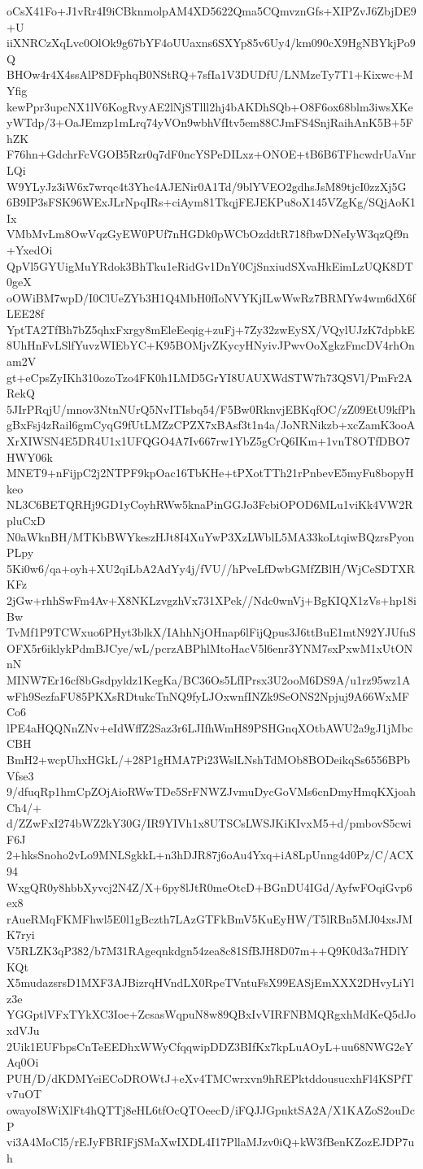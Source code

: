 oCsX41Fo+J1vRr4I9iCBknmolpAM4XD5622Qma5CQmvznGfs+XIPZvJ6ZbjDE9+U
iiXNRCzXqLvc0OlOk9g67bYF4oUUaxns6SXYp85v6Uy4/km090cX9HgNBYkjPo9Q
BHOw4r4X4ssAlP8DFphqB0NStRQ+7sfIa1V3DUDfU/LNMzeTy7T1+Kixwc+MYfig
kewPpr3upcNX1lV6KogRvyAE2lNjSTlll2hj4bAKDhSQb+O8F6ox68blm3iwsXKe
yWTdp/3+OaJEmzp1mLrq74yVOn9wbhVfItv5em88CJmFS4SnjRaihAnK5B+5FhZK
F76hn+GdchrFcVGOB5Rzr0q7dF0ncYSPeDILxz+ONOE+tB6B6TFhcwdrUaVnrLQi
W9YLyJz3iW6x7wrqc4t3Yhc4AJENir0A1Td/9blYVEO2gdhsJsM89tjcI0zzXj5G
6B9IP3sFSK96WExJLrNpqIRs+ciAym81TkqjFEJEKPu8oX145VZgKg/SQjAoK1Ix
VMbMvLm8OwVqzGyEW0PUf7nHGDk0pWCbOzddtR718fbwDNeIyW3qzQf9n+YxedOi
QpVl5GYUigMuYRdok3BhTku1eRidGv1DnY0CjSnxiudSXvaHkEimLzUQK8DT0geX
oOWiBM7wpD/I0ClUeZYb3H1Q4MbH0fIoNVYKjILwWwRz7BRMYw4wm6dX6fLEE28f
YptTA2TfBh7bZ5qhxFxrgy8mEleEeqig+zuFj+7Zy32zwEySX/VQylUJzK7dpbkE
8UhHnFvLSlfYuvzWIEbYC+K95BOMjvZKycyHNyivJPwvOoXgkzFmcDV4rhOnam2V
gt+eCpsZyIKh310ozoTzo4FK0h1LMD5GrYI8UAUXWdSTW7h73QSVl/PmFr2ARekQ
5JIrPRqjU/mnov3NtnNUrQ5NvITIsbq54/F5Bw0RknvjEBKqfOC/zZ09EtU9kfPh
gBxFsj4zRail6gmCyqG9fUtLMZzCPZX7xBAsf3t1n4a/JoNRNikzb+xcZamK3ooA
XrXIWSN4E5DR4U1x1UFQGO4A7Iv667rw1YbZ5gCrQ6IKm+1vnT8OTfDBO7HWY06k
MNET9+nFijpC2j2NTPF9kpOac16TbKHe+tPXotTTh21rPnbevE5myFu8bopyHkeo
NL3C6BETQRHj9GD1yCoyhRWw5knaPinGGJo3FcbiOPOD6MLu1viKk4VW2RpluCxD
N0aWknBH/MTKbBWYkeszHJt8I4XuYwP3XzLWblL5MA33koLtqiwBQzrsPyonPLpy
5Ki0w6/qa+oyh+XU2qiLbA2AdYy4j/fVU//hPveLfDwbGMfZBlH/WjCeSDTXRKFz
2jGw+rhhSwFm4Av+X8NKLzvgzhVx731XPek//Ndc0wnVj+BgKIQX1zVs+hp18iBw
TvMf1P9TCWxuo6PHyt3blkX/IAhhNjOHnap6lFijQpus3J6ttBuE1mtN92YJUfuS
OFX5r6iklykPdmBJCye/wL/pcrzABPhlMtoHacV5l6enr3YNM7sxPxwM1xUtONnN
MINW7Er16cf8bGsdpyldz1KegKa/BC36Os5LfIPrsx3U2ooM6DS9A/u1rz95wz1A
wFh9SezfaFU85PKXsRDtukcTnNQ9fyLJOxwnfINZk9SeONS2Npjuj9A66WxMFCo6
lPE4aHQQNnZNv+eIdWffZ2Saz3r6LJIfhWmH89PSHGnqXOtbAWU2a9gJ1jMbcCBH
BmH2+wcpUhxHGkL/+28P1gHMA7Pi23WslLNshTdMOb8BODeikqSs6556BPbVfse3
9/dfuqRp1hmCpZOjAioRWwTDe5SrFNWZJvmuDycGoVMs6cnDmyHmqKXjoahCh4/+
d/ZZwFxI274bWZ2kY30G/IR9YIVh1x8UTSCsLWSJKiKIvxM5+d/pmbovS5cwiF6J
2+hksSnoho2vLo9MNLSgkkL+n3hDJR87j6oAu4Yxq+iA8LpUnng4d0Pz/C/ACX94
WxgQR0y8hbbXyvcj2N4Z/X+6py8lJtR0meOtcD+BGnDU4IGd/AyfwFOqiGvp6ex8
rAueRMqFKMFhwl5E0l1gBczth7LAzGTFkBmV5KuEyHW/T5lRBn5MJ04xsJMK7ryi
V5RLZK3qP382/b7M31RAgeqnkdgn54zea8c81SfBJH8D07m++Q9K0d3a7HDlYKQt
X5mudazsrsD1MXF3AJBizrqHVndLX0RpeTVntuFsX99EASjEmXXX2DHvyLiYlz3e
YGGptlVFxTYkXC3Ioe+ZcsasWqpuN8w89QBxIvVIRFNBMQRgxhMdKeQ5dJoxdVJu
2Uik1EUFbpsCnTeEEDhxWWyCfqqwipDDZ3BIfKx7kpLuAOyL+uu68NWG2eYAq0Oi
PUH/D/dKDMYeiECoDROWtJ+eXv4TMCwrxvn9hREPktddousucxhFl4KSPfTv7uOT
owayoI8WiXlFt4hQTTj8eHL6tfOcQTOeecD/iFQJJGpnktSA2A/X1KAZoS2ouDcP
vi3A4MoCl5/rEJyFBRIFjSMaXwIXDL4I17PllaMJzv0iQ+kW3fBenKZozEJDP7uh
